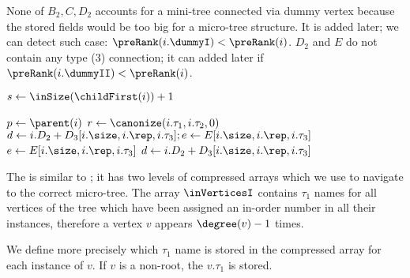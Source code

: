None of $B_2, C, D_2$ accounts for a mini-tree connected via dummy vertex because the stored fields would be too big for a micro-tree structure.
It is added later; we can detect such case: $\preRank(i.\dummyI) < \preRank(i)$.
$D_2$ and $E$ do not contain any type (3) connection; it can added later if $\preRank(i.\dummyII) < \preRank(i)$.

\begin{algorithm}
\begin{algorithmic}
		\State {}
	\Else
		\State $s \gets \inSize(\childFirst(i)) + 1$
		
			\State $p \gets \parent(i)$
				\State $r \gets \canonize(i.\tau_1, i.\tau_2, 0)$
				 
					\State $d \gets i.D_2 + D_3[i.\size, i.\rep, i.\tau_3]; e \gets E[i.\size, i.\rep, i.\tau_3]$
					\State {}
				\Else {}
					\State $e \gets E[i.\size, i.\rep, i.\tau_3]$
					\State {}
				\EndIf
			 
				\State $d \gets i.D_2 + D_3[i.\size, i.\rep, i.\tau_3]$
				\State {}
			\Else {}
				\State {}
			\EndIf
		 
			\State {}
		\Else {}
			\State {}
		\EndIf
	\EndIf
\EndFunction
\end{algorithmic}
\end{algorithm}

\bigbreak

The \inSelect{} is similar to \preSelect{}; it has two levels of compressed arrays which we use to navigate to the correct micro-tree.
The array $\inVerticesI$ contains $\tau_1$ names for all vertices of the tree which have been assigned an in-order number in all their instances, therefore a vertex $v$ appears $\degree(v) - 1$ times.

We define more precisely which $\tau_1$ name is stored in the compressed array for each instance of $v$.
If $v$ is a non-root, the $v.\tau_1$ is stored.

